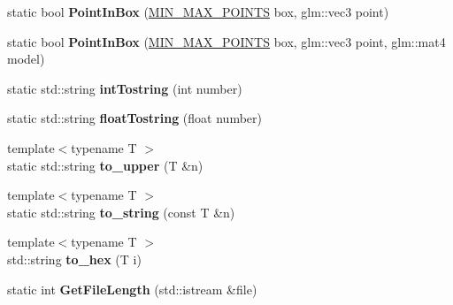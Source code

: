 \begin{DoxyCompactItemize}
\item 
static bool {\bfseries Point\+In\+Box} (\hyperlink{struct_m_i_n___m_a_x___p_o_i_n_t_s}{M\+I\+N\+\_\+\+M\+A\+X\+\_\+\+P\+O\+I\+N\+TS} box, glm\+::vec3 point)\hypertarget{namespace_helpers_a70cdfc01f8f62aee45006b9edbfb26db}{}\label{namespace_helpers_a70cdfc01f8f62aee45006b9edbfb26db}

\item 
static bool {\bfseries Point\+In\+Box} (\hyperlink{struct_m_i_n___m_a_x___p_o_i_n_t_s}{M\+I\+N\+\_\+\+M\+A\+X\+\_\+\+P\+O\+I\+N\+TS} box, glm\+::vec3 point, glm\+::mat4 model)\hypertarget{namespace_helpers_a737c77db97d77ac0dbc6ba9ace2121d2}{}\label{namespace_helpers_a737c77db97d77ac0dbc6ba9ace2121d2}

\item 
static std\+::string {\bfseries int\+Tostring} (int number)\hypertarget{namespace_helpers_a17d4e5f43ffde45165fd1734903093dd}{}\label{namespace_helpers_a17d4e5f43ffde45165fd1734903093dd}

\item 
static std\+::string {\bfseries float\+Tostring} (float number)\hypertarget{namespace_helpers_a8a359bd6e91550e29701baa0831f13d8}{}\label{namespace_helpers_a8a359bd6e91550e29701baa0831f13d8}

\item 
{\footnotesize template$<$typename T $>$ }\\static std\+::string {\bfseries to\+\_\+upper} (T \&n)\hypertarget{namespace_helpers_a401c1ffbe17403a5d9c61fb2b2250967}{}\label{namespace_helpers_a401c1ffbe17403a5d9c61fb2b2250967}

\item 
{\footnotesize template$<$typename T $>$ }\\static std\+::string {\bfseries to\+\_\+string} (const T \&n)\hypertarget{namespace_helpers_a6203676cbd30926d4cedc78a31ed79d4}{}\label{namespace_helpers_a6203676cbd30926d4cedc78a31ed79d4}

\item 
{\footnotesize template$<$typename T $>$ }\\std\+::string {\bfseries to\+\_\+hex} (T i)\hypertarget{namespace_helpers_a5dc8d8382c9a1720ae777e173916689f}{}\label{namespace_helpers_a5dc8d8382c9a1720ae777e173916689f}

\item 
static int {\bfseries Get\+File\+Length} (std\+::istream \&file)\hypertarget{namespace_helpers_a3ef45f1b25708c5dac83e95fb3ad9526}{}\label{namespace_helpers_a3ef45f1b25708c5dac83e95fb3ad9526}


\end{DoxyCompactItemize}
